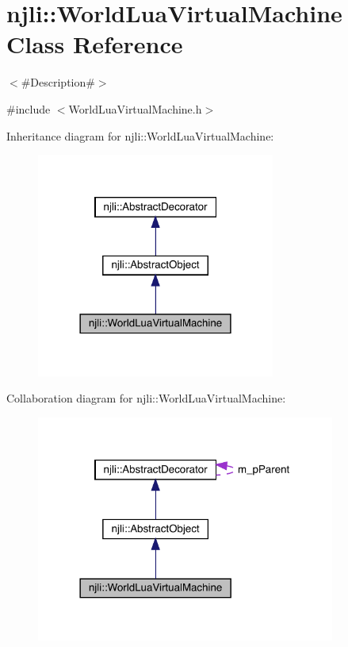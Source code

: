 \hypertarget{classnjli_1_1_world_lua_virtual_machine}{}\section{njli\+:\+:World\+Lua\+Virtual\+Machine Class Reference}
\label{classnjli_1_1_world_lua_virtual_machine}


$<$\#\+Description\#$>$  




{\ttfamily \#include $<$World\+Lua\+Virtual\+Machine.\+h$>$}



Inheritance diagram for njli\+:\+:World\+Lua\+Virtual\+Machine\+:\nopagebreak
\begin{figure}[H]
\begin{center}
\leavevmode
\includegraphics[width=222pt]{classnjli_1_1_world_lua_virtual_machine__inherit__graph}
\end{center}
\end{figure}


Collaboration diagram for njli\+:\+:World\+Lua\+Virtual\+Machine\+:\nopagebreak
\begin{figure}[H]
\begin{center}
\leavevmode
\includegraphics[width=278pt]{classnjli_1_1_world_lua_virtual_machine__coll__graph}
\end{center}
\end{figure}
